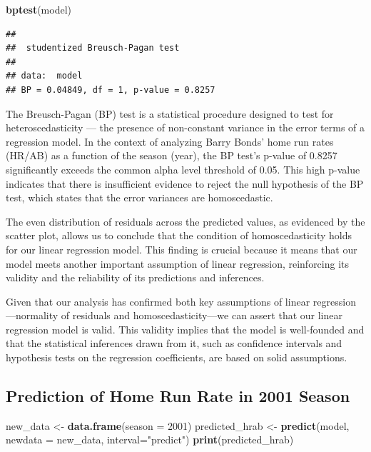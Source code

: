 \documentclass[
]{article}
\newenvironment{Shaded}{\begin{snugshade}}{\end{snugshade}}
\newcommand{\AttributeTok}[1]{\textcolor[rgb]{0.13,0.29,0.53}{#1}}
\newcommand{\DecValTok}[1]{\textcolor[rgb]{0.00,0.00,0.81}{#1}}
\newcommand{\FunctionTok}[1]{\textcolor[rgb]{0.13,0.29,0.53}{\textbf{#1}}}
\newcommand{\NormalTok}[1]{#1}
\newcommand{\OtherTok}[1]{\textcolor[rgb]{0.56,0.35,0.01}{#1}}
\newcommand{\StringTok}[1]{\textcolor[rgb]{0.31,0.60,0.02}{#1}}
\begin{document}
\begin{Shaded}
\begin{Highlighting}[]
\FunctionTok{bptest}\NormalTok{(model)}
\end{Highlighting}
\end{Shaded}

\begin{verbatim}
## 
##  studentized Breusch-Pagan test
## 
## data:  model
## BP = 0.04849, df = 1, p-value = 0.8257
\end{verbatim}

The Breusch-Pagan (BP) test is a statistical procedure designed to test
for heteroscedasticity --- the presence of non-constant variance in the
error terms of a regression model. In the context of analyzing Barry
Bonds' home run rates (HR/AB) as a function of the season (year), the BP
test's p-value of 0.8257 significantly exceeds the common alpha level
threshold of 0.05. This high p-value indicates that there is
insufficient evidence to reject the null hypothesis of the BP test,
which states that the error variances are homoscedastic.

The even distribution of residuals across the predicted values, as
evidenced by the scatter plot, allows us to conclude that the condition
of homoscedasticity holds for our linear regression model. This finding
is crucial because it means that our model meets another important
assumption of linear regression, reinforcing its validity and the
reliability of its predictions and inferences.

Given that our analysis has confirmed both key assumptions of linear
regression---normality of residuals and homoscedasticity---we can assert
that our linear regression model is valid. This validity implies that
the model is well-founded and that the statistical inferences drawn from
it, such as confidence intervals and hypothesis tests on the regression
coefficients, are based on solid assumptions.

\hypertarget{prediction-of-home-run-rate-in-2001-season}{%
\subsection{Prediction of Home Run Rate in 2001
Season}\label{prediction-of-home-run-rate-in-2001-season}}

\begin{Shaded}
\begin{Highlighting}[]
\NormalTok{new\_data }\OtherTok{\textless{}{-}} \FunctionTok{data.frame}\NormalTok{(}\AttributeTok{season =} \DecValTok{2001}\NormalTok{)}
\NormalTok{predicted\_hrab }\OtherTok{\textless{}{-}} \FunctionTok{predict}\NormalTok{(model, }\AttributeTok{newdata =}\NormalTok{ new\_data, }\AttributeTok{interval=}\StringTok{"predict"}\NormalTok{)}
\FunctionTok{print}\NormalTok{(predicted\_hrab)}
\end{Highlighting}
\end{Shaded}
\end{document}
